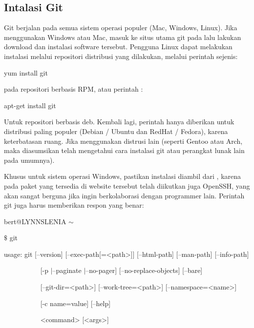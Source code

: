 \subsection{Intalasi Git} \par
\hspace*{0.50in} Git berjalan pada semua sistem operasi populer (Mac, Windows, Linux). Jika menggunakan Windows atau Mac, masuk ke situs utama git pada lalu lakukan download dan instalasi software tersebut. Pengguna Linux dapat melakukan instalasi melalui repositori distribusi yang dilakukan, melalui perintah sejenis: \par
\noindent 
{\fontsize{10pt}{10pt}\selectfont yum install git} \par
\vspace{12pt}
\noindent 
pada repositori berbasis RPM, atau perintah : \par
\noindent 
{\fontsize{10pt}{10pt}\selectfont apt-get install git} \par
\vspace{12pt}
\hspace*{0.50in} Untuk repositori berbasis deb. Kembali lagi, perintah hanya diberikan untuk distribusi paling populer (Debian / Ubuntu dan RedHat / Fedora), karena keterbatasan ruang. Jika menggunakan distrusi lain (seperti Gentoo atau Arch, maka diasumsikan telah mengetahui cara instalasi git atau perangkat lunak lain pada umumnya). \par
\hspace*{0.50in} Khusus untuk sistem operasi Windows, pastikan instalasi diambil dari 
, karena pada paket yang tersedia di website tersebut telah diikutkan juga OpenSSH, yang akan sangat berguna jika ingin berkolaborasi dengan programmer lain. Perintah git juga harus memberikan respon yang benar: \par
\noindent 
{\fontsize{10pt}{10pt}\selectfont bert@LYNNSLENIA  $  \sim  $} \par
\noindent 
{\fontsize{10pt}{10pt}\selectfont  $  \$  $ git} \par
\noindent 
{\fontsize{10pt}{10pt}\selectfont usage: git [--version] [--exec-path[=<path>]] [--html-path] [--man-path] [--info-path]} \par
\noindent 
{\fontsize{10pt}{10pt}\selectfont ~~~~~~~~~~ [-p $  \vert  $--paginate $  \vert  $--no-pager] [--no-replace-objects] [--bare]} \par
\noindent 
{\fontsize{10pt}{10pt}\selectfont ~~~~~~~~~~ [--git-dir=<path>] [--work-tree=<path>] [--namespace=<name>]} \par
\noindent 
{\fontsize{10pt}{10pt}\selectfont ~~~~~~~~~~ [-c name=value] [--help]} \par
\noindent 
{\fontsize{10pt}{10pt}\selectfont ~~~~~~~~~~ <command> [<args>]} \par


